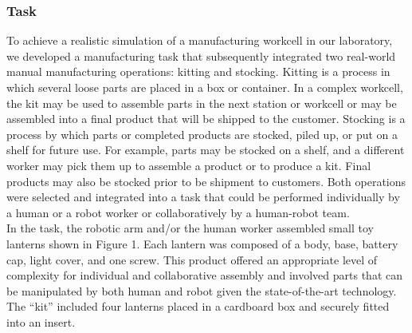 \subsubsection{Task}
       To achieve a realistic simulation of a manufacturing workcell in our laboratory, we developed a manufacturing task that subsequently integrated two real-world manual manufacturing operations: kitting and stocking. Kitting is a process in which several loose parts are placed in a box or container. In a complex workcell, the kit may be used to assemble parts in the next station or workcell  or may be assembled into a final product that will be shipped to the customer.  Stocking is a process by which parts or completed products are stocked, piled up, or put on a shelf for future use. For example, parts may be stocked on a shelf, and a different  worker may pick them up to assemble a product or to produce a kit. Final products may also be stocked prior to be shipment to customers. Both operations were selected and integrated into a task that could be performed individually by a human or a robot worker or collaboratively by a human-robot team.\\
       In the task, the robotic arm and/or the human worker assembled small toy lanterns shown in Figure 1. Each lantern was composed of a body, base, battery cap, light cover, and one screw. This product offered an appropriate level of complexity for individual and collaborative assembly and involved parts that can be manipulated by both human and robot given the state-of-the-art technology.  The “kit” included four lanterns placed in a cardboard box and securely fitted into an insert.
